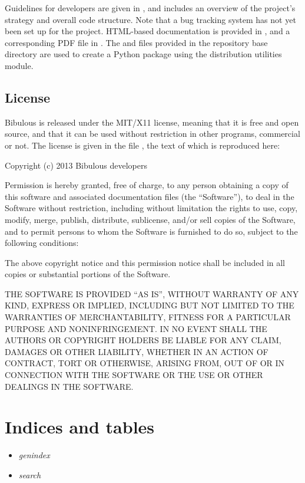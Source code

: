 \documentclass[letterpaper,10pt,english]{sphinxmanual}
\begin{document}
Guidelines for developers are given in , and includes an overview of the project's strategy and overall code structure. Note that a bug tracking system has not yet been set up for the project. HTML-based documentation is provided in , and a corresponding PDF file in . The  and  files provided in the repository base directory are used to create a Python package using the  distribution utilities module.


\section{License}
\label{index:license}
Bibulous is released under the MIT/X11 license, meaning that it is free and open source, and that it can be used without restriction in other programs, commercial or not. The license is given in the file , the text of which is reproduced here:

Copyright (c) 2013 Bibulous developers

Permission is hereby granted, free of charge, to any person obtaining a copy of this software and
associated documentation files (the ``Software''), to deal in the Software without restriction,
including without limitation the rights to use, copy, modify, merge, publish, distribute,
sublicense, and/or sell copies of the Software, and to permit persons to whom the Software is
furnished to do so, subject to the following conditions:

The above copyright notice and this permission notice shall be included in all copies or
substantial portions of the Software.

THE SOFTWARE IS PROVIDED ``AS IS'', WITHOUT WARRANTY OF ANY KIND, EXPRESS OR IMPLIED, INCLUDING BUT
NOT LIMITED TO THE WARRANTIES OF MERCHANTABILITY, FITNESS FOR A PARTICULAR PURPOSE AND
NONINFRINGEMENT. IN NO EVENT SHALL THE AUTHORS OR COPYRIGHT HOLDERS BE LIABLE FOR ANY CLAIM,
DAMAGES OR OTHER LIABILITY, WHETHER IN AN ACTION OF CONTRACT, TORT OR OTHERWISE, ARISING FROM, OUT
OF OR IN CONNECTION WITH THE SOFTWARE OR THE USE OR OTHER DEALINGS IN THE SOFTWARE.


\chapter{Indices and tables}
\label{index:indices-and-tables}\begin{itemize}
\item {} 
\emph{genindex}

\item {} 
\emph{search}

\end{itemize}
\end{document}
